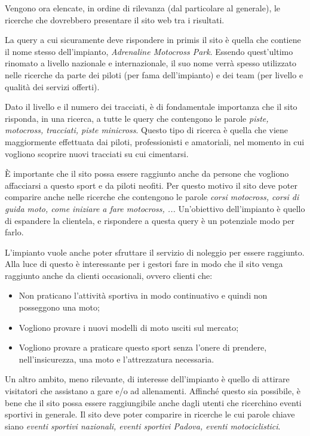 Vengono ora elencate, in ordine di rilevanza (dal particolare al generale), le ricerche che dovrebbero presentare il sito web tra i risultati.

La query a cui sicuramente deve rispondere in primis il sito è quella che contiene il nome stesso dell'impianto, \textit{Adrenaline Motocross Park}. Essendo quest'ultimo rinomato a livello nazionale e internazionale, il suo nome verrà spesso utilizzato nelle ricerche da parte dei piloti (per fama dell'impianto) e dei team (per livello e qualità dei servizi offerti).

Dato il livello e il numero dei tracciati, è di fondamentale importanza che il sito risponda, in una ricerca, a tutte le query che contengono le parole \textit{piste, motocross, tracciati, piste minicross}. Questo tipo di ricerca è quella che viene maggiormente effettuata dai piloti, professionisti e amatoriali, nel momento in cui vogliono scoprire nuovi tracciati su cui cimentarsi.

È importante che il sito possa essere raggiunto anche da persone che vogliono affacciarsi a questo sport e da piloti neofiti. Per questo motivo il sito deve poter comparire anche nelle ricerche che contengono le parole \textit{corsi motocross, corsi di guida moto, come iniziare a fare motocross, ...} Un'obiettivo dell'impianto è quello di espandere la clientela, e rispondere a questa query è un potenziale modo per farlo.

L'impianto vuole anche poter sfruttare il servizio di noleggio per essere raggiunto. Alla luce di questo è interessante per i gestori fare in modo che il sito venga raggiunto anche da clienti occasionali, ovvero clienti che:
\begin{itemize}
\item Non praticano l'attività sportiva in modo continuativo e quindi non posseggono una moto;
\item Vogliono provare i nuovi modelli di moto usciti sul mercato;
\item Vogliono provare a praticare questo sport senza l'onere di prendere, nell'insicurezza, una moto e l'attrezzatura necessaria.
\end{itemize}

Un altro ambito, meno rilevante, di interesse dell'impianto è quello di attirare visitatori che assistano a gare e/o ad allenamenti. Affinché questo sia possibile, è bene che il sito possa essere raggiungibile anche dagli utenti che ricerchino eventi sportivi in generale. Il sito deve poter comparire in ricerche le cui parole chiave siano \textit{eventi sportivi nazionali, eventi sportivi Padova, eventi motociclistici}.

